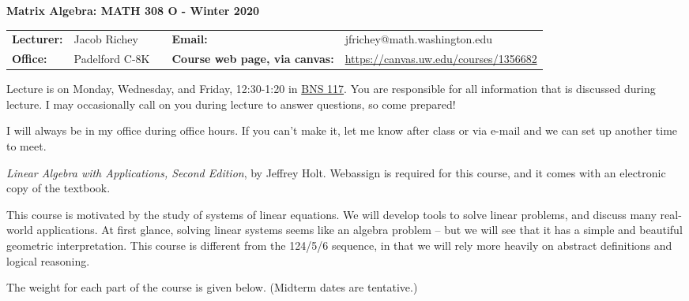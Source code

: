 \documentclass[11 pt]{report}
\begin{document}
\centerline{\bf Matrix Algebra: MATH 308 O - Winter 2020}
\vspace{0.2cm}
\begin{tabular}{lllll}
{\bf Lecturer: }    & Jacob Richey &  & {\bf Email: }       & jfrichey@math.washington.edu \\
{\bf Office: }      & Padelford C-8K        &  & {\bf Course web page, via canvas: }    & \href{https://canvas.uw.edu/courses/1356682}{https://canvas.uw.edu/courses/1356682} \\
\end{tabular}
\vspace{0.25cm}

  Lecture is on Monday, Wednesday, and Friday, 12:30-1:20 in \href{https://www.washington.edu/classroom/BNS}{BNS 117}.  You
are responsible for all information that is discussed
during lecture. I may occasionally call on you during lecture to answer questions, so come prepared!
\vspace{0.25cm}

I will always be in my office during office hours. If you can't make it, let me know after class or via e-mail and we can set up another time to meet.  \vspace{0.25cm}

 \emph{Linear Algebra with Applications, Second Edition}, by Jeffrey Holt. Webassign is required for this course, and it comes with an electronic copy of the textbook. 

\vspace{0.25cm}

  This course is motivated by the study of systems of linear equations. We will 
develop tools to solve linear problems, and discuss many real-world applications. At first glance, solving
linear systems seems like an algebra problem -- but we will see that it has a simple and beautiful geometric interpretation. 
This course is different from the 124/5/6 sequence, in that we will rely more heavily on abstract definitions and logical reasoning. 

\vspace{0.25cm}

 The weight for each part of the course is given
below. (Midterm dates are tentative.)

\vspace{-.25in}
\end{document}
